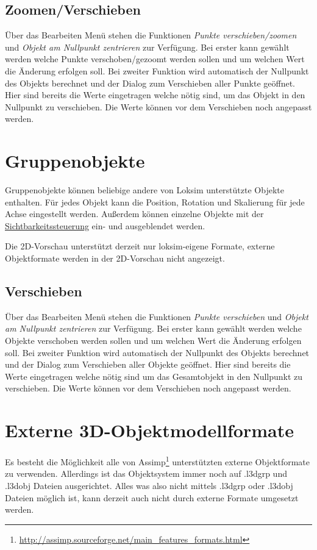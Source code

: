 \subsection{Zoomen/Verschieben}
\label{sec:editor-obj-l3dobj-punkteverschieben}
Über das Bearbeiten Menü stehen die Funktionen \emph{Punkte verschieben/zoomen} und \emph{Objekt am Nullpunkt zentrieren} zur Verfügung. Bei erster kann gewählt werden welche Punkte verschoben/gezoomt werden sollen und um welchen Wert die Änderung erfolgen soll. Bei zweiter Funktion wird automatisch der Nullpunkt des Objekts berechnet und der Dialog zum Verschieben aller Punkte geöffnet. Hier sind bereits die Werte eingetragen welche nötig sind, um das Objekt in den Nullpunkt zu verschieben. Die Werte können vor dem Verschieben noch angepasst werden.

\section{Gruppenobjekte}
\label{sec:editor-obj-grp}
Gruppenobjekte können beliebige andere von Loksim unterstützte Objekte enthalten. Für jedes Objekt kann die Position, Rotation und Skalierung für jede Achse eingestellt werden. Außerdem können einzelne Objekte mit der \hyperref[sec:editor-obj-sichtbarkeitssteuerung]{Sichtbarkeitssteuerung} ein- und ausgeblendet werden.

Die 2D-Vorschau unterstützt derzeit nur loksim-eigene Formate, externe Objektformate werden in der 2D-Vorschau nicht angezeigt.
\subsection{Verschieben}
\label{sec:editor-obj-grp-verschieben}
Über das Bearbeiten Menü stehen die Funktionen \emph{Punkte verschieben} und \emph{Objekt am Nullpunkt zentrieren} zur Verfügung. Bei erster kann gewählt werden welche Objekte verschoben werden sollen und um welchen Wert die Änderung erfolgen soll. Bei zweiter Funktion wird automatisch der Nullpunkt des Objekts berechnet und der Dialog zum Verschieben aller Objekte geöffnet. Hier sind bereits die Werte eingetragen welche nötig sind um das Gesamtobjekt in den Nullpunkt zu verschieben. Die Werte können vor dem Verschieben noch angepasst werden.


\section{Externe 3D-Objektmodellformate}
\label{sec:editor-obj-externe}
Es besteht die Möglichkeit alle von Assimp\footnote{\url{http://assimp.sourceforge.net/main_features_formats.html}} unterstützten externe Objektformate zu verwenden. Allerdings ist das Objektsystem immer noch auf .l3dgrp und .l3dobj Dateien ausgerichtet. Alles was also nicht mittels .l3dgrp oder .l3dobj Dateien möglich ist, kann derzeit auch nicht durch externe Formate umgesetzt werden.

